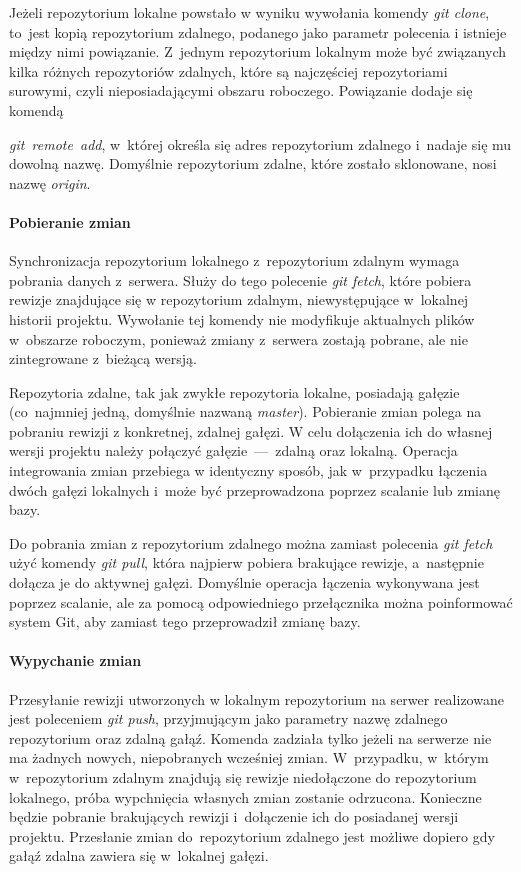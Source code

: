 \documentclass[12pt,a4paper,polish,thesis]{dcsbook}
\begin{document}
	Jeżeli repozytorium lokalne powstało w wyniku wywołania komendy \textit{git clone}, to~jest kopią repozytorium zdalnego, podanego jako parametr polecenia i istnieje między nimi powiązanie.
	Z~jednym repozytorium lokalnym może być związanych kilka różnych repozytoriów zdalnych, które są najczęściej repozytoriami surowymi, czyli nieposiadającymi obszaru roboczego. Powiązanie dodaje się komendą {\textit{git~remote~add}, w~której określa się adres repozytorium zdalnego i~nadaje się mu dowolną nazwę. Domyślnie repozytorium zdalne, które zostało sklonowane, nosi nazwę \mbox{\textit{origin}}.

	\paragraph{Pobieranie zmian}
	Synchronizacja repozytorium lokalnego z~repozytorium zdalnym wymaga pobrania danych z~serwera. Służy do tego polecenie \textit{git fetch}, które pobiera rewizje znajdujące się w repozytorium zdalnym, niewystępujące w~lokalnej historii projektu. Wywołanie tej komendy nie modyfikuje aktualnych plików w~obszarze roboczym, ponieważ zmiany z~serwera zostają pobrane, ale nie zintegrowane z~bieżącą wersją.

	Repozytoria zdalne, tak jak zwykłe repozytoria lokalne, posiadają gałęzie (co~najmniej jedną, domyślnie nazwaną \textit{master}). Pobieranie zmian polega na pobraniu rewizji z konkretnej, zdalnej gałęzi. W celu dołączenia ich do własnej wersji projektu należy połączyć gałęzie~---~zdalną oraz lokalną. Operacja integrowania zmian przebiega w identyczny sposób, jak w~przypadku łączenia dwóch gałęzi lokalnych i~może być przeprowadzona poprzez scalanie lub zmianę bazy.

	Do pobrania zmian z repozytorium zdalnego można zamiast polecenia \textit{git fetch} użyć komendy \textit{git pull}, która najpierw pobiera brakujące rewizje, a~następnie dołącza je do aktywnej gałęzi. Domyślnie operacja łączenia wykonywana jest poprzez scalanie, ale za pomocą odpowiedniego przełącznika można poinformować system Git, aby zamiast tego przeprowadził zmianę bazy.

	\paragraph{Wypychanie zmian}
	Przesyłanie rewizji utworzonych w lokalnym repozytorium na serwer realizowane jest poleceniem \textit{git push}, przyjmującym jako parametry nazwę zdalnego repozytorium oraz zdalną gałąź. Komenda zadziała tylko jeżeli na serwerze nie ma żadnych nowych, niepobranych wcześniej zmian. W~przypadku, w~którym w~repozytorium zdalnym znajdują się rewizje niedołączone do repozytorium lokalnego, próba wypchnięcia własnych zmian zostanie odrzucona. Konieczne będzie pobranie brakujących rewizji i~dołączenie ich do posiadanej wersji projektu. Przesłanie zmian do~repozytorium zdalnego jest możliwe dopiero gdy gałąź zdalna zawiera się w~lokalnej gałęzi.

}
\end{document}
